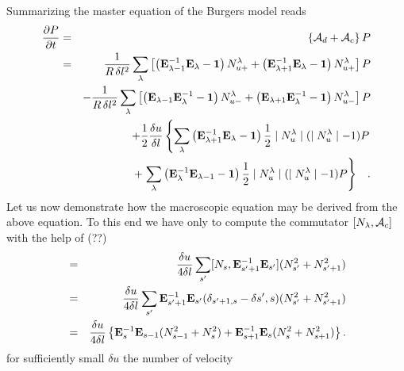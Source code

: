 Summarizing the master equation of the Burgers model reads
\begin{eqnarray}
\label{BURGERSMEQ}
\frac{\partial P}{\partial t} &=&
\left\{ {\cal{A}}_d + {\cal{A}}_c \right\} P
                \nonumber \\
& =  &  \frac{1}{R \, \delta l^2}
\sum_{\lambda} \left[ \left( {\bf{E}}_{\lambda -1}^{-1}
{\bf{E}}_{\lambda}
     - {\bf{1}} \right) N_{u+}^{\lambda}
     + \left( {\bf{E}}_{\lambda +1}^{-1} {\bf{E}}_{\lambda}
     - {\bf{1}} \right) N_{u+}^{\lambda} \right] P  \nonumber \\
 &&  - \frac{1}{R \, \delta l^2}
 \sum_{\lambda} \left[
      \left( {\bf{E}}_{\lambda -1} {\bf{E}}_{\lambda}^{-1}
     - {\bf{1}} \right)  N_{u-}^{\lambda} 
     + \left( {\bf{E}}_{\lambda +1} {\bf{E}}_{\lambda}^{-1}
     - {\bf{1}} \right)  N_{u-}^{\lambda}  \right] P  \nonumber \\
&  & + \frac{1}{2}
\frac{\delta u}{\delta l} \left\{
                          \sum_{\lambda}
    \left( {\bf E}_{\lambda +1}^{-1} {\bf E}_{\lambda} - {\bf 1}
          \right) \frac{1}{2} \mid N_u^{\lambda}\mid
          (\mid N_u^{\lambda} \mid -1) P \right.
               \nonumber \\
& & + \left.  \sum_{\lambda}
       \left( {\bf E}_{\lambda}^{-1} {\bf E}_{\lambda -1} - {\bf 1}
          \right) \frac{1}{2} \mid N_u^{\lambda}\mid
           (\mid N_u^{\lambda}\mid -1) P \right\}
           \;\;\; .
\end{eqnarray}
Let us now demonstrate how the macroscopic equation may be derived from the
above equation. To this end we have only to compute the commutator 
$[N_{\lambda},{\cal{A}}_c]$ with the help of (??)
\begin{eqnarray*}
  [N_s, {\cal{A}}_c] & = & \frac{\delta u}{4 \delta l} \sum_{s'}
                        [N_s, {\bf E}_{s'+1}^{-1} {\bf E}_{s'}]
                          (N_{s'}^2 + N_{s' +1}^2) \\
                     & = & \frac{\delta u}{4 \delta l} \sum_{s'}
                     {\bf E}_{s'+1}^{-1} {\bf E}_{s'}
                       (\delta_{s'+1,s} - \delta{s',s}) 
                       (N_{s'}^2 + N_{s'+1}^2) \\
                    & = &  \frac{\delta u}{4 \delta l} \left\{
                      {\bf E}_{s}^{-1} {\bf E}_{s-1}
                       (N_{s-1}^2 + N_{s}^2)
               +      {\bf E}_{s+1}^{-1} {\bf E}_{s}
                           (N_{s}^2 + N_{s+1}^2)   \right\}.
\end{eqnarray*}
for sufficiently small $\delta u $ the number of velocity

